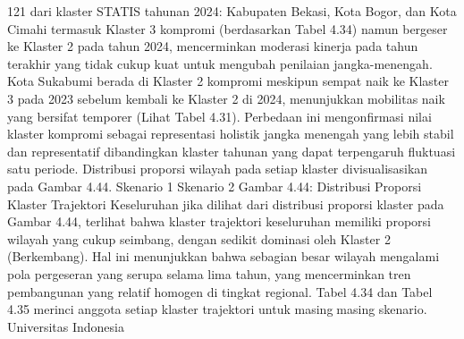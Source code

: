 121
dari klaster STATIS tahunan 2024: Kabupaten Bekasi, Kota Bogor, dan Kota Cimahi
termasuk Klaster 3 kompromi (berdasarkan Tabel 4.34) namun bergeser ke Klaster 2
pada tahun 2024, mencerminkan moderasi kinerja pada tahun terakhir yang tidak cukup
kuat untuk mengubah penilaian jangka-menengah. Kota Sukabumi berada di Klaster 2
kompromi meskipun sempat naik ke Klaster 3 pada 2023 sebelum kembali ke Klaster 2 di
2024, menunjukkan mobilitas naik yang bersifat temporer (Lihat Tabel 4.31). Perbedaan
ini mengonfirmasi nilai klaster kompromi sebagai representasi holistik jangka menengah
yang lebih stabil dan representatif dibandingkan klaster tahunan yang dapat terpengaruh
fluktuasi satu periode. Distribusi proporsi wilayah pada setiap klaster divisualisasikan pada
Gambar 4.44.
Skenario 1 Skenario 2
Gambar 4.44: Distribusi Proporsi Klaster Trajektori Keseluruhan
jika dilihat dari distribusi proporsi klaster pada Gambar 4.44, terlihat bahwa klaster
trajektori keseluruhan memiliki proporsi wilayah yang cukup seimbang, dengan sedikit
dominasi oleh Klaster 2 (Berkembang). Hal ini menunjukkan bahwa sebagian besar
wilayah mengalami pola pergeseran yang serupa selama lima tahun, yang mencerminkan
tren pembangunan yang relatif homogen di tingkat regional.
Tabel 4.34 dan Tabel 4.35 merinci anggota setiap klaster trajektori untuk masingmasing skenario.
Universitas Indonesia

